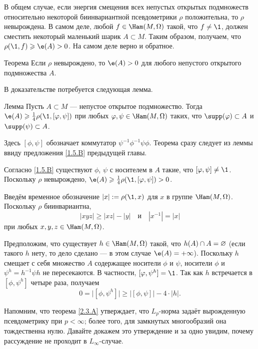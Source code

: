 В общем случае, если энергия смещения всех непустых открытых подмножеств относительно некоторой биинвариантной псевдометрики $\rho$ положительна, то $\rho$ невырождена.
В самом деле, любой $f \in \Ham (M, \Omega)$ такой, что $f \ne \1$,
должен сместить некоторый маленький шарик $A \subset M$.
Таким образом, получаем, что $\rho (\1, f) \ge \e (A)> 0$.
На самом деле верно и обратное.

\begin{thm}[(\cite{EP})]{Теорема}\label{2.4.A}
Если $\rho$ невырождено, то $\e (A)> 0$ для любого непустого открытого подмножества $A$.
\end{thm}

В доказательстве потребуется следующая лемма.

\begin{thm}{Лемма}\label{2.4.B}
Пусть $A \subset M$ — непустое открытое подмножество.
Тогда $\e (A) \ge \tfrac14 \rho (\1, [\phi, \psi])$ при любых $\phi, \psi \in \Ham (M, \Omega)$ таких, что $\supp (\phi) \subset A$ и $\supp (\psi) \subset A$.
\end{thm}

Здесь $[\phi, \psi]$ обозначает коммутатор $\psi^{-1} \phi^{-1} \psi\phi$.
Теорема сразу следует из леммы ввиду предложения \ref{1.5.B} предыдущей главы.

Согласно \ref{1.5.B} существуют $\phi$, $\psi$ с носителем в $A$ такие, что $[\phi, \psi] \ne \1$.
Поскольку $\rho$ невырождено, $\e (A) \z\ge \tfrac14 \rho (\1, [\phi, \psi])> 0$.
\qeds


Введём временное обозначение $|x|\z\df\rho(\1,x)$
для $x$ в группе $\Ham (M, \Omega)$.
Поскольку $\rho$ биинвариантна,
\[
|xyz|
\ge
|xz|-|y|
\quad\text{и}\quad
|x^{-1}|=|x|
\]
при любых $x,y,z\in \Ham (M, \Omega)$.

Предположим, что существует $h \in \Ham (M, \Omega)$ такой, что $h (A) \z\cap A \z= \emptyset$ (если такого $h$ нету, то дело сделано — в этом случае $\e (A) \z= + \infty$).
Поскольку $h$ смещает с себя множество $A$ содержащее носители $\phi$ и $\psi$,
носители $\phi$ и $\psi^{h}=h^{-1} \psi h$ не пересекаются.
В частности, $[\phi,\psi^{h}]=\1$.
Так как $h$ встречается в $[\phi,\psi^{h}]$ четыре раза, получаем
\[
0=\big|[\phi,\psi^{h}]\big|
\ge
\big|[\phi,\psi]\big| - 4\cdot|h|.
\]
\qedsf

Напомним, что теорема \ref{2.3.A} утверждает, что $L_p$-норма задаёт вырожденную псевдометрику при $p <\infty$;
более того, для замкнутых многообразий она тождественна нулю.
Давайте докажем это утверждение и за одно увидим, почему рассуждение не проходит в $L_\infty$-случае.

